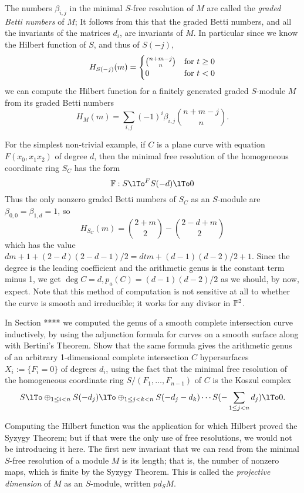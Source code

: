 The numbers $\beta_{i,j}$ in  the minimal $S$-free resolution of $M$ are called the \emph{graded Betti numbers} of $M$; It follows from this that the graded Betti numbers, and all the invariants of the matrices $d_{i}$, are invariants of $M$. In particular since we know the Hilbert function of $S$, and thus of $S(-j)$,
$$
H_{S(-j)}(m) = 
\begin{cases}
 {n+m-j \choose n} & \hbox{for $t\geq 0$}
  \\ 
 0 & \hbox{for $t<0$}
\end{cases}
$$
we can compute the Hilbert function for a finitely generated graded $S$-module $M$ from its graded Betti numbers 
$$
H_{M}(m) = \sum_{i,j} (-1)^{i}\beta_{i,j}{n+m-j\choose n}.
$$
\begin{example}  
For the simplest non-trivial example, if $C$ is a plane curve with equation $F(x_{0},x_{1}x_{2})$ of 
degree $d$, then the minimal free resolution of the homogeneous coordinate ring $S_{C}$ has the form
$$
\FF: S\lTo^{F}S(-d)\lTo 0
$$
Thus the only nonzero graded Betti numbers of $S_{C}$ as an $S$-module are
 $\beta_{0,0} = \beta_{1,d} = 1$, so
$$
 H_{S_{C}}(m) = {2+m\choose 2} - {2-d+m\choose 2}
 $$
 which has the value  $dm + 1+(2-d)(2-d-1)/2 = dtm+ (d-1)(d-2)/2 +1$. Since the degree is the leading coefficient and the arithmetic genus is the constant term minus 1, we get
$\deg C = d, p_{a}(C) = (d-1)(d-2)/2$ as we should, by now, expect. Note that this method of computation is not sensitive at all to whether the curve is smooth and irreducible; it works for any divisor in ${\mathbb P}^{2}$.
\end{example}

\begin{exercise} In Section **** we computed the genus of a smooth complete intersection curve inductively, by using the adjunction formula for curves on a smooth surface along with Bertini's Theorem.
Show that the same formula gives the arithmetic genus of an arbitrary 1-dimensional complete intersection $C$ hypersurfaces 
$X_{i} := \{F_{i} = 0\}$ of degrees $d_{i}$,
using the fact that the minimal free resolution of the homogeneous coordinate ring 
$S/(F_{1}, \dots, F_{n-1})$ of $C$  is the Koszul complex
$$
 S \lTo \oplus_{1\leq i<n}S(-d_{j}) \lTo  \oplus_{1\leq j<k<n}S(-d_{j}-d_{k}) \cdots S(-\sum_{1\leq j<n}d_{j})\lTo 0.
 $$
\end{exercise}

Computing the Hilbert function was the application for which Hilbert proved the Syzygy Theorem; but if that were the only use of free resolutions, we would not be introducing it here. The first new invariant that we can read from the minimal $S$-free resolution of a module $M$ is its length; that is, the number of nonzero maps, which is finite by the Syzygy Theorem. This is called the \emph{projective dimension} of $M$ as an $S$-module, written $pd_{S}M$. 

